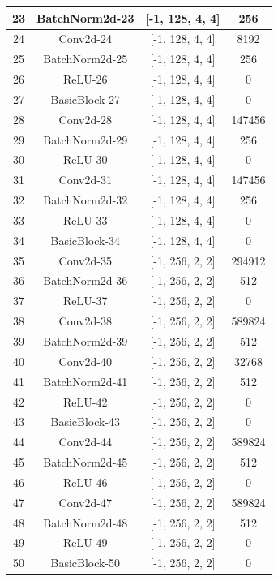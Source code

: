 \documentclass[UTF-8]{article}
\begin{document}
\begin{center}
\begin{tabular}{|c|c|c|c|}
		\hline
		23 &       BatchNorm2d-23   &  [-1, 128, 4, 4]   & 256 \\
		\hline
		24 &            Conv2d-24   &  [-1, 128, 4, 4]   & 8192 \\
		\hline
		25 &       BatchNorm2d-25   &  [-1, 128, 4, 4]   & 256 \\
		\hline
		26 &              ReLU-26   &  [-1, 128, 4, 4]   & 0 \\
		\hline
		27 &        BasicBlock-27   &  [-1, 128, 4, 4]   & 0 \\
		\hline
		28 &            Conv2d-28   &  [-1, 128, 4, 4]   & 147456 \\
		\hline
		29 &       BatchNorm2d-29   &  [-1, 128, 4, 4]   & 256 \\
		\hline
		30 &              ReLU-30   &  [-1, 128, 4, 4]   & 0 \\
		\hline
		31 &            Conv2d-31   &  [-1, 128, 4, 4]   & 147456 \\
		\hline
		32 &       BatchNorm2d-32   &  [-1, 128, 4, 4]   & 256 \\
		\hline
		33 &              ReLU-33   &  [-1, 128, 4, 4]   & 0 \\
		\hline
		34 &        BasicBlock-34   &  [-1, 128, 4, 4]   & 0 \\
		\hline
		35 &            Conv2d-35   &  [-1, 256, 2, 2]   & 294912 \\
		\hline
		36 &       BatchNorm2d-36   &  [-1, 256, 2, 2]   & 512 \\
		\hline
		37 &              ReLU-37   &  [-1, 256, 2, 2]   & 0 \\
		\hline
		38 &            Conv2d-38   &  [-1, 256, 2, 2]   & 589824 \\
		\hline
		39 &       BatchNorm2d-39   &  [-1, 256, 2, 2]   & 512 \\
		\hline
		40 &            Conv2d-40   &  [-1, 256, 2, 2]   & 32768 \\
		\hline
		41 &       BatchNorm2d-41   &  [-1, 256, 2, 2]   & 512 \\
		\hline
		42 &              ReLU-42   &  [-1, 256, 2, 2]   & 0 \\
		\hline
		43 &        BasicBlock-43   &  [-1, 256, 2, 2]   & 0 \\
		\hline
		44 &            Conv2d-44   &  [-1, 256, 2, 2]   & 589824 \\
		\hline
		45 &       BatchNorm2d-45   &  [-1, 256, 2, 2]   & 512 \\
		\hline
		46 &              ReLU-46   &  [-1, 256, 2, 2]   & 0 \\
		\hline
		47 &            Conv2d-47   &  [-1, 256, 2, 2]   & 589824 \\
		\hline
		48 &       BatchNorm2d-48   &  [-1, 256, 2, 2]   & 512 \\
		\hline
		49 &              ReLU-49   &  [-1, 256, 2, 2]   & 0 \\
		\hline
		50 &        BasicBlock-50   &  [-1, 256, 2, 2]   & 0 \\
		\hline
	\end{tabular}
	\newpage
	

\end{center}
\end{document}
